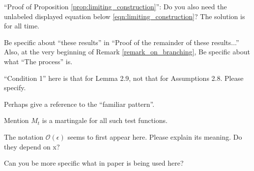 \begin{point}{}
``Proof of Proposition \ref{prop:limiting_construction}'': Do you also need the unlabeled displayed equation below
\eqref{eqn:limiting_construction}? The solution is for all time.
\end{point}


\begin{point}{\revref}
Be specific about ``these results'' in ``Proof of the remainder of these results...'' Also, at the
very beginning of Remark \ref{remark_on_branching}, Be specific about what ``The process'' is.
\end{point}


\begin{point}{\revref}
``Condition 1'' here is that for Lemma 2.9, not that for Assumptions 2.8. Please specify.
\end{point}


\begin{point}{\revref}
Perhaps give a reference to the ``familiar pattern''.
\end{point}


\begin{point}{\revref}
Mention $M_t$ is a martingale for all such test functions.
\end{point}


\begin{point}{\revref}
    The notation $\mathcal{O}(\epsilon)$ seems to first appear here. Please explain its meaning. Do they
depend on x?
\end{point}


\begin{point}{\revref}
    Can you be more specific what in paper \citet{barlow/jacka/yor:1986} is being used here?
\end{point}


